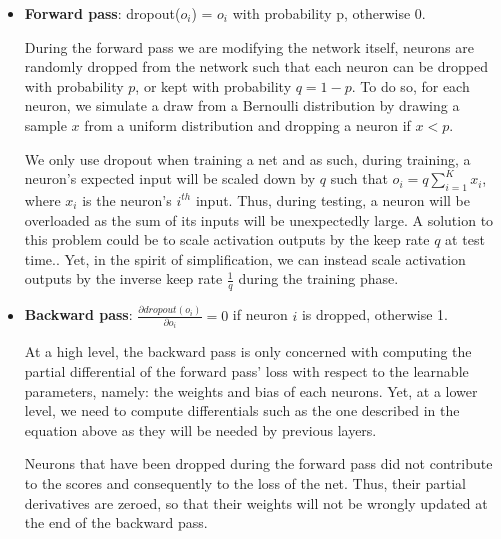 \begin{itemize}[topsep=-10pt]
\item \textbf{Forward pass}: dropout($o_i$) = $o_i$ with probability p, otherwise 0.
  
During the forward pass we are modifying the network itself,
neurons are randomly dropped from the network such that each neuron can be dropped with probability $p$,
or kept with probability $q = 1- p$.
To do so, for each neuron, we simulate a draw from a Bernoulli distribution by drawing a sample $x$ from a uniform distribution
and dropping a neuron if $x < p$.

We only use dropout when training a net and as such, during training, a neuron's expected input will be scaled down by $q$ such that $o_i = q\sum_{i=1}^K x_i$, where $x_i$ is the neuron's $i^{th}$ input.
Thus, during testing, a neuron will be overloaded as the sum of its inputs will be unexpectedly large.
A solution to this problem could be to scale activation outputs by the keep rate $q$ at test time..
Yet, in the spirit of simplification,
we can instead scale activation outputs by the inverse keep rate $\frac{1}{q}$ during the training phase.


\item \textbf{Backward pass}: $\frac{\partial dropout(o_i)}{\partial o_i} = 0 $ if neuron $i$ is dropped, otherwise 1.

  At a high level, the backward pass is only concerned with computing the partial differential of the forward pass' loss with respect to the
  learnable parameters, namely: the weights and bias of each neurons.
  Yet, at a lower level, we need to compute differentials such as the one described in the equation above as they will be needed
  by previous layers.

  Neurons that have been dropped during the forward pass did not contribute to the scores and consequently to the loss of the net.
  Thus, their partial derivatives are zeroed, so that their weights will not be wrongly updated at the end of the backward pass.
\end{itemize}



